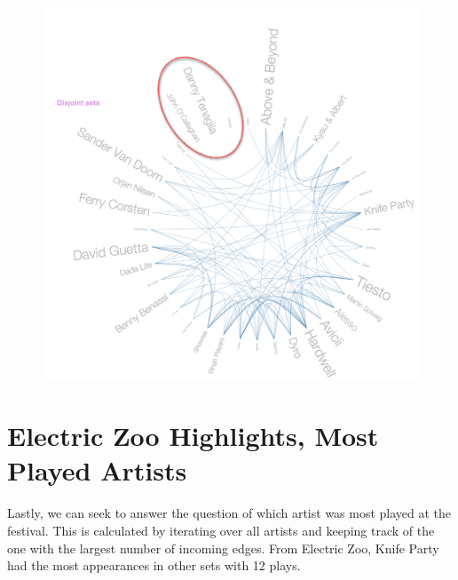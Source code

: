 \documentclass[12pt]{dalcsthesis}
\begin{document}
\begin{figure}[h]
\includegraphics[scale=.5]{disjoint_sets}
\centering
\end{figure}

\section{Electric Zoo Highlights, Most Played Artists}

Lastly, we can seek to answer the question of which artist was most played at the festival. This is calculated by iterating over all artists and keeping track of the one with the largest number of incoming edges. From Electric Zoo, Knife Party had the most appearances in other sets with 12 plays.  \newpage
\end{document}
